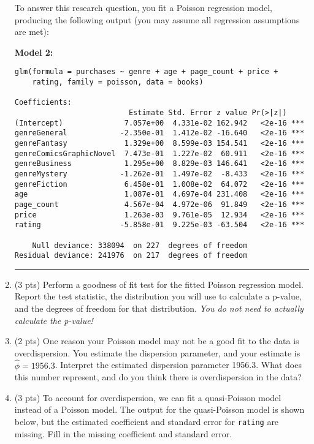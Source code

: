 \documentclass[11pt]{article}
\begin{document}
\begin{enumerate}
To answer this research question, you fit a Poisson regression model, producing the following output (you may assume all regression assumptions are met):

\textbf{Model 2:}

\begin{verbatim}
glm(formula = purchases ~ genre + age + page_count + price + 
    rating, family = poisson, data = books)
    
Coefficients:
                          Estimate Std. Error z value Pr(>|z|)    
(Intercept)              7.057e+00  4.331e-02 162.942   <2e-16 ***
genreGeneral            -2.350e-01  1.412e-02 -16.640   <2e-16 ***
genreFantasy             1.329e+00  8.599e-03 154.541   <2e-16 ***
genreComicsGraphicNovel  7.473e-01  1.227e-02  60.911   <2e-16 ***
genreBusiness            1.295e+00  8.829e-03 146.641   <2e-16 ***
genreMystery            -1.262e-01  1.497e-02  -8.433   <2e-16 ***
genreFiction             6.458e-01  1.008e-02  64.072   <2e-16 ***
age                      1.087e-01  4.697e-04 231.408   <2e-16 ***
page_count               4.567e-04  4.972e-06  91.849   <2e-16 ***
price                    1.263e-03  9.761e-05  12.934   <2e-16 ***
rating                  -5.858e-01  9.225e-03 -63.504   <2e-16 ***

    Null deviance: 338094  on 227  degrees of freedom
Residual deviance: 241976  on 217  degrees of freedom
\end{verbatim}

\rule{\textwidth}{1pt}

\item (3 pts) Perform a goodness of fit test for the fitted Poisson regression model. Report the test statistic, the distribution you will use to calculate a p-value, and the degrees of freedom for that distribution. \textit{You do not need to actually calculate the p-value!}

\newpage

\item (2 pts) One reason your Poisson model may not be a good fit to the data is overdispersion. You estimate the dispersion parameter, and your estimate is $\widehat{\phi} = 1956.3$. Interpret the estimated dispersion parameter 1956.3. What does this number represent, and do you think there is overdispersion in the data?

\vspace{4cm}

\item (3 pts) To account for overdispersion, we can fit a quasi-Poisson model instead of a Poisson model. The output for the quasi-Poisson model is shown below, but the estimated coefficient and standard error for \verb;rating; are missing. Fill in the missing coefficient and standard error.


\end{enumerate}
\end{document}
